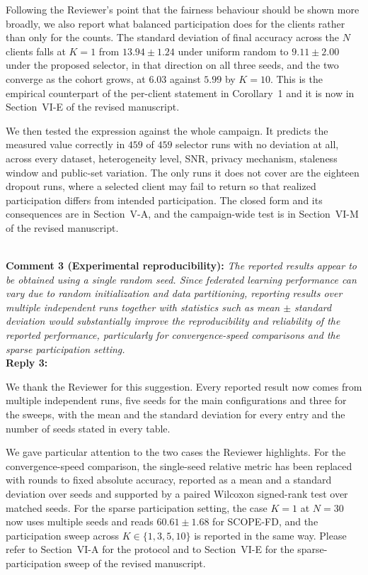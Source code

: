 \documentclass[10pt]{article}
\begin{document}
{Following the Reviewer's point that the fairness behaviour should be shown more broadly, we also report what balanced participation does for the clients rather than only for the counts. The standard deviation of final accuracy across the $N$ clients falls at $K = 1$ from $13.94 \pm 1.24$ under uniform random to $9.11 \pm 2.00$ under the proposed selector, in that direction on all three seeds, and the two converge as the cohort grows, at $6.03$ against $5.99$ by $K = 10$. This is the empirical counterpart of the per-client statement in Corollary~1 and it is now in Section~VI-E of the revised manuscript.

We then tested the expression against the whole campaign. It predicts the measured value correctly in $459$ of $459$ selector runs with no deviation at all, across every dataset, heterogeneity level, SNR, privacy mechanism, staleness window and public-set variation. The only runs it does not cover are the eighteen dropout runs, where a selected client may fail to return so that realized participation differs from intended participation. The closed form and its consequences are in Section~V-A, and the campaign-wide test is in Section~VI-M of the revised manuscript.}\\

\noindent
\textbf{Comment 3 (Experimental reproducibility):} \textit{The reported results appear to be obtained using a single random seed. Since federated learning performance can vary due to random initialization and data partitioning, reporting results over multiple independent runs together with statistics such as mean $\pm$ standard deviation would substantially improve the reproducibility and reliability of the reported performance, particularly for convergence-speed comparisons and the sparse participation setting.} \\
\noindent
\textbf{Reply 3:} {We thank the Reviewer for this suggestion. Every reported result now comes from multiple independent runs, five seeds for the main configurations and three for the sweeps, with the mean and the standard deviation for every entry and the number of seeds stated in every table.

We gave particular attention to the two cases the Reviewer highlights. For the convergence-speed comparison, the single-seed relative metric has been replaced with rounds to fixed absolute accuracy, reported as a mean and a standard deviation over seeds and supported by a paired Wilcoxon signed-rank test over matched seeds. For the sparse participation setting, the case $K = 1$ at $N = 30$ now uses multiple seeds and reads $60.61 \pm 1.68$ for SCOPE-FD, and the participation sweep across $K \in \{1, 3, 5, 10\}$ is reported in the same way. Please refer to Section~VI-A for the protocol and to Section~VI-E for the sparse-participation sweep of the revised manuscript.}\\
\end{document}
